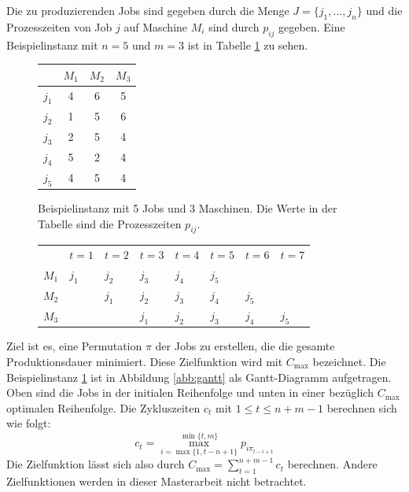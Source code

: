 \documentclass{scrreprt}
\begin{document}
Die zu produzierenden Jobs sind gegeben durch die Menge $J=\{j_1,\ldots,j_n\}$ 
und die Prozesszeiten von Job $j$ auf Maschine $M_i$ sind durch $p_{ij}$ gegeben.
Eine Beispielinstanz mit $n=5$ und $m=3$ ist in Tabelle \ref{abb:Bsp} zu sehen.
\begin{figure}
    \begin{center}
        \begin{tabular}{c|ccc}
            & $M_1$ & $M_2$ & $M_3$ \\ \hline
            $j_1$ & 4 & 6 & 5 \\
            $j_2$ & 1 & 5 & 6 \\
            $j_3$ & 2 & 5 & 4 \\
            $j_4$ & 5 & 2 & 4 \\
            $j_5$ & 4 & 5 & 4
        \end{tabular}
    \end{center}
    \caption{
        \label{abb:Bsp}
        Beispielinstanz mit 5 Jobs und 3 Maschinen. Die Werte in der Tabelle sind die Prozesszeiten $p_{ij}$.
    }
\end{figure}
\begin{figure}
    \begin{center}
        \begin{tabular}{l p{0.8cm} | p{1.2cm} | p{1cm} | p{1.2cm} | p{0.8cm} | p{1cm} | p{0.8cm}}
            & $t=1$ & $t=2$ & $t=3$ & $t=4$ & $t=5$ & $t=6$ & $t=7$ \\
            $M_1$ & $j_1$ & $j_2$ & $j_3$ & $j_4$ & $j_5$ & & \\
            $M_2$ & & $j_1$ & $j_2$ & $j_3$ & $j_4$ & $j_5$ & \\
            $M_3$ & & & $j_1$ & $j_2$ & $j_3$ & $j_4$ & $j_5$ 
        \end{tabular}
    \end{center}
\end{figure}
Ziel ist es, eine Permutation $\pi$ der Jobs zu erstellen, die die gesamte Produktionsdauer minimiert.
Diese Zielfunktion wird mit $C_{\max}$ bezeichnet.
Die Beispielinstanz \ref{abb:Bsp} ist in Abbildung \ref{abb:gantt} als Gantt-Diagramm aufgetragen.
Oben sind die Jobs in der initialen Reihenfolge und unten in einer bezüglich $C_{\max}$ optimalen Reihenfolge.
Die Zykluszeiten $c_t$ mit $1\leq t\leq n+m-1$ berechnen sich wie folgt:
\[ c_t = \max_{i=\max\{1,t-n+1\}}^{\min\{t,m\}} p_{i\pi_{t-i+1}} \]
Die Zielfunktion lässt sich also durch $C_{\max} = \sum_{t=1}^{n+m-1} c_t$ berechnen.
Andere Zielfunktionen werden in dieser Masterarbeit nicht betrachtet.
\end{document}
